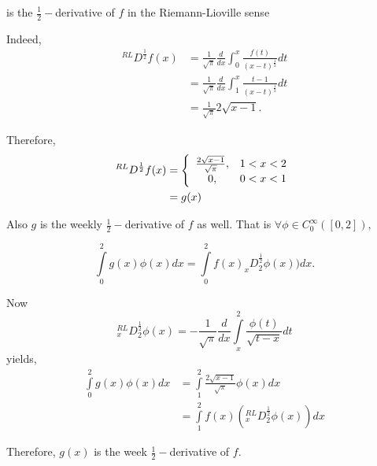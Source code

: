 \documentclass{amsart}%
\theoremstyle{plain}
\numberwithin{equation}{section}
\begin{document}
is the $\frac{1}{2}-$derivative of $f$ in the Riemann-Lioville sense

Indeed,
\begin{align*}
^{RL}D^{\frac{1}{2}}f(x)  & =\frac{1}{\sqrt{\pi}}\frac{d}{dx}\int_{0}^{x}%
\frac{f(t)}{\left(  x-t\right)  ^{\frac{1}{2}}}dt\\
& =\frac{1}{\sqrt{\pi}}\frac{d}{dx}\int_{1}^{x}\frac{t-1}{\left(  x-t\right)
^{\frac{1}{2}}}dt\\
& =\frac{1}{\sqrt{\pi}}2\sqrt{x-1}.
\end{align*}


Therefore,
\begin{align*}
^{RL}D^{\frac{1}{2}}f(x)  & =\left\{
\begin{array}
[c]{cc}%
\frac{2\sqrt{x-1}}{\sqrt{\pi}}, & 1<x<2\\
0, & 0<x<1
\end{array}
\right. \\
& =g(x)
\end{align*}


Also $g$ is the weekly $\frac{1}{2}-$derivative of $f$ as well. That is
$\forall\phi\in C_{0}^{\infty}\left(  \left[  0,2\right]  \right)  ,$%

\[%
{\displaystyle\int\limits_{0}^{2}}
g(x)\phi\left(  x\right)  dx=%
{\displaystyle\int\limits_{0}^{2}}
f(x)_{x}D_{2}^{\frac{1}{2}}\phi\left(  x\right)  )dx.
\]


Now
\[
_{x}^{RL}D_{2}^{\frac{1}{2}}\phi\left(  x\right)  =-\frac{1}{\sqrt{\pi}}%
\frac{d}{dx}%
{\displaystyle\int\limits_{x}^{2}}
\frac{\phi\left(  t\right)  }{\sqrt{t-x}}dt
\]
yields,
\begin{align*}%
{\displaystyle\int\limits_{0}^{2}}
g(x)\phi\left(  x\right)  dx  & =%
{\displaystyle\int\limits_{1}^{2}}
\frac{2\sqrt{x-1}}{\sqrt{\pi}}\phi\left(  x\right)  dx\\
& =%
{\displaystyle\int\limits_{1}^{2}}
f(x)\left(  _{x}^{RL}D_{2}^{\frac{1}{2}}\phi\left(  x\right)  \right)  dx
\end{align*}


Therefore, $g(x)$ is the week $\frac{1}{2}-$derivative of $f.$
\end{document}
